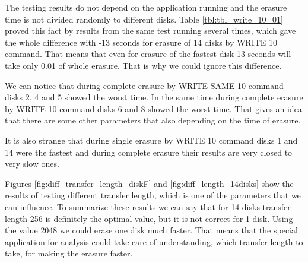 The testing results do not depend on the application running and the erasure time is not divided randomly to different disks. Table \ref{tbl:tbl_write_10_01} proved this fact by results from the same test running several times, which gave the whole difference with -13 seconds for erasure of 14 disks by WRITE 10 command. That means that even for erasure of the fastest disk 13 seconds will take only 0.01 of whole erasure. That is why we could ignore this difference. 

We can notice that during complete erasure by WRITE SAME 10 command disks 2, 4 and 5 showed the worst time. In the same time during complete erasure by WRITE 10 command disks 6 and 8 showed the worst time. That gives an idea that there are some other parameters that also depending on the time of erasure.

It is also strange that during single erasure by WRITE 10 command disks 1 and 14 were the fastest and during complete erasure their results are very closed to very slow ones.

Figures \ref{fig:diff_transfer_length_diskF} and \ref{fig:diff_length_14disks} show the results of testing different transfer length, which is one of the parameters that we can influence. To summarize these results we can say that for 14 disks transfer length 256 is definitely the optimal value, but it is not correct for 1 disk. Using the value 2048 we could erase one disk much faster. That means that the special application for analysis could take care of understanding, which transfer length to take, for making the erasure faster.
